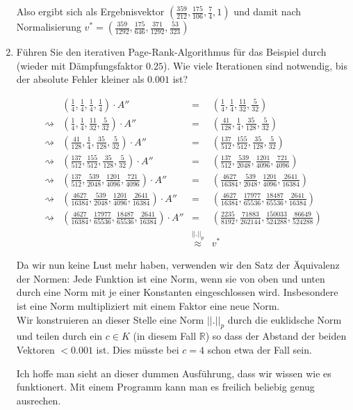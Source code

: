\documentclass[11pt,a4paper,ngerman]{article}
\begin{document}
\begin{enumerate}[\bfseries a)]
Also ergibt sich als Ergebnisvektor $\left( \frac{359}{212}, \frac{175}{106}, \frac{7}{4}, 1 \right)$ und damit nach Normalisierung $v^{*} = \left( \frac{359}{1292}, \frac{175}{646}, \frac{371}{1292}, \frac{53}{323} \right) $
\item Führen Sie den iterativen Page-Rank-Algorithmus für das Beispiel durch (wieder mit Dämpfungsfaktor $0.25$). Wie viele Iterationen sind notwendig, bis der absolute Fehler kleiner als $0.001$ ist?

$$
\begin{array}{crcl}
\quad &
\left( \frac{1}{4}, \frac{1}{4}, \frac{1}{4}, \frac{1}{4} \right) \cdot A'' & = &
\left( \frac{1}{4}, \frac{1}{4}, \frac{11}{32}, \frac{5}{32} \right) \\
\rightsquigarrow &
\left( \frac{1}{4}, \frac{1}{4}, \frac{11}{32}, \frac{5}{32} \right) \cdot A'' & = &
\left( \frac{41}{128}, \frac{1}{4}, \frac{35}{128}, \frac{5}{32} \right) \\
\rightsquigarrow &
\left( \frac{41}{128}, \frac{1}{4}, \frac{35}{128}, \frac{5}{32} \right) \cdot A'' & = &
\left( \frac{137}{512}, \frac{155}{512}, \frac{35}{128}, \frac{5}{32} \right) \\
\rightsquigarrow &
\left( \frac{137}{512}, \frac{155}{512}, \frac{35}{128}, \frac{5}{32} \right) \cdot A'' & = &
\left( \frac{137}{512}, \frac{539}{2048}, \frac{1201}{4096}, \frac{721}{4096} \right) \\
\rightsquigarrow &
\left( \frac{137}{512}, \frac{539}{2048}, \frac{1201}{4096}, \frac{721}{4096} \right) \cdot A'' & = &
\left( \frac{4627}{16384}, \frac{539}{2048}, \frac{1201}{4096}, \frac{2641}{16384} \right) \\
\rightsquigarrow &
\left( \frac{4627}{16384}, \frac{539}{2048}, \frac{1201}{4096}, \frac{2641}{16384} \right) \cdot A'' & = &
\left( \frac{4627}{16384}, \frac{17977}{65536}, \frac{18487}{65536}, \frac{2641}{16384} \right) \\
\rightsquigarrow &
\left( \frac{4627}{16384}, \frac{17977}{65536}, \frac{18487}{65536}, \frac{2641}{16384} \right) \cdot A'' & = &
\left( \frac{2235}{8192}, \frac{71883}{262144}, \frac{150033}{524288}, \frac{86649}{524288} \right) \\
&&\stackrel{||.||_p}{\approx}& v^*
\end{array}
$$

Da wir nun keine Lust mehr haben, verwenden wir den Satz der Äquivalenz der Normen: Jede Funktion ist eine Norm, wenn sie von oben und unten durch eine Norm mit je einer Konstanten eingeschlossen wird. Insbesondere ist eine Norm multipliziert mit einem Faktor eine neue Norm.\\

 Wir konstruieren an dieser Stelle eine Norm $||.||_p$ durch die euklidsche Norm und teilen durch ein $c\in K$ (in diesem Fall $\mathbb{R}$) so dass der Abstand der beiden Vektoren $<0.001$ ist. Dies müsste bei $c=4$ schon etwa der Fall sein.

Ich hoffe man sieht an dieser dummen Ausführung, dass wir wissen wie es funktionert. Mit einem Programm kann man es freilich beliebig genug ausrechen.
\end{enumerate}
\end{document}
